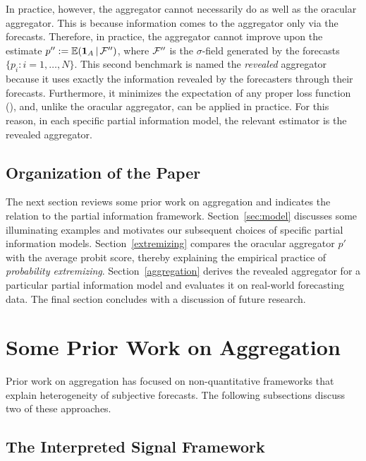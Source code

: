 \documentclass[11pt]{article}
\newcommand{\E}{\mathbb{E}}
\theoremstyle{definition}
\theoremstyle{definition}
\def\one{{\bf 1}}
\def\F{{\cal F}}
\def\E{{\mathbb E}}
\def\|{\, | \,}
\begin{document}
In practice, however, the aggregator cannot necessarily do as well as
the oracular aggregator.  This is because information comes to the
aggregator only via the forecasts. Therefore, in practice, the
aggregator cannot improve upon the estimate $p'' := \E (\one_A \|
\F'')$, where $\F''$ is the $\sigma$-field generated by the forecasts
$\{ p_i : i = 1, \dots, N \}$. This second benchmark is named the {\em
revealed} aggregator because it uses exactly the information revealed
by the forecasters through their forecasts.  Furthermore, it minimizes
the expectation of any proper loss function (\citealt{Ranjan08}), and,
unlike the oracular aggregator, can be applied in practice. For this
reason, in each specific partial information model, the relevant
estimator is the revealed aggregator.


\subsection{Organization of the Paper}

The next section reviews some prior work on aggregation and indicates
the relation to the partial information framework.
Section~\ref{sec:model} discusses some illuminating examples and
motivates our subsequent choices of specific partial information
models.  Section~\ref{extremizing} compares the oracular aggregator
$p'$ with the average probit score, thereby explaining the
empirical practice of {\em probability extremizing}.
Section~\ref{aggregation} derives the revealed aggregator for a
particular partial information model and evaluates it on real-world
forecasting data.  The final section concludes with a discussion of
future research.



\section{Some Prior Work on Aggregation}
\label{sec:prior}

Prior work on aggregation has focused on non-quantitative frameworks
that explain heterogeneity of subjective forecasts.  The following
subsections discuss two of these approaches.

\subsection{The Interpreted Signal Framework}
\label{ss:inerpreted}
\end{document}

